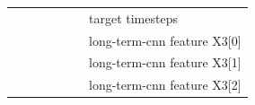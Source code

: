 \begin{table}[]
\begin{tabular}{llllllllllll}
                                                      &                                                  &                                                  &                                                &                                                  & \cellcolor[HTML]{34FF34}                         & \multicolumn{6}{l}{target timesteps}                                                                                                                                                                                                                                                                             \\
                                                      &                                                  &                                                  &                                                &                                                  & \cellcolor[HTML]{38FFF8}                         & \multicolumn{6}{l}{long-term-cnn feature X3{[}0{]}}                                                                                                                                                                                                                                                             \\
                                                      &                                                  &                                                  &                                                &                                                  & \cellcolor[HTML]{68CBD0}                         & \multicolumn{6}{l}{long-term-cnn feature X3{[}1{]}}                                                                                                                                                                                                                                                             \\
                                                      &                                                  &                                                  &                                                &                                                  & \cellcolor[HTML]{34696D}                         & \multicolumn{6}{l}{long-term-cnn feature X3{[}2{]}}                                                                                                                                                                                                                                                             \\

\end{tabular}
\end{table}
